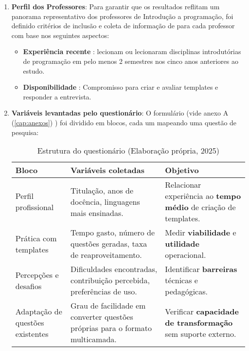 \begin{enumerate}
    \item \textbf{Perfil dos Professores}:  Para garantir que os resultados reflitam um panorama representativo dos professores de Introdução a programação, foi definido critérios de inclusão e coleta de informação de para cada professor com base nos seguintes aspectos: 
    \begin{itemize}
        \item \textbf{Experiência recente} : lecionam ou lecionaram disciplinas introdutórias de programação em pelo menos 2 semestres nos cinco anos anteriores ao estudo. 
        \item \textbf{Disponibilidade} : Compromisso para criar e avaliar templates e responder a entrevista.
    \end{itemize}

    \item \textbf{Variáveis levantadas pelo questionário}:  O formulário (vide anexo A  (\ref{cap:anexos}) ) foi dividido em blocos, cada um mapeando uma questão de pesquisa: 

\begin{table}[htbp]
    \centering
    \renewcommand{\arraystretch}{1.3}
    \begin{tabular}{|p{4cm}|p{5.4cm}|p{6cm}|}
        \hline
        \textbf{Bloco} & \textbf{Variáveis coletadas} & \textbf{Objetivo} \\ \hline
        Perfil profissional & Titulação, anos de docência, linguagens mais ensinadas. & Relacionar experiência ao \textbf{tempo médio} de criação de templates. \\ \hline
        Prática com templates & Tempo gasto, número de questões geradas, taxa de reaproveitamento. & Medir \textbf{viabilidade} e \textbf{utilidade} operacional. \\ \hline
        Percepções e desafios & Dificuldades encontradas, contribuição percebida, preferências de uso. & Identificar \textbf{barreiras} técnicas e pedagógicas. \\ \hline
        Adaptação de questões existentes & Grau de facilidade em converter questões próprias para o formato multicamada. & Verificar \textbf{capacidade de transformação} sem suporte externo. \\ \hline
    \end{tabular}
    \caption{Estrutura do questionário (Elaboração própria, 2025)}
    \label{tab:questionario-objetivos}
\end{table}




\end{enumerate}
